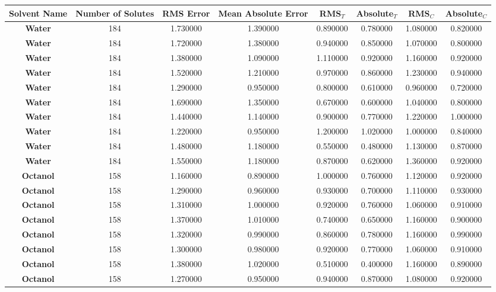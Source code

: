 \documentclass{amsart}
\begin{document}
 
\begin{center}
\begin{tabular}{c|c|c|c|c|c|c|c} 
\textbf{Solvent Name}&\textbf{Number of Solutes}&\textbf{RMS Error}&\textbf{Mean Absolute Error}&\textbf{RMS$_{T}$}&\textbf{Absolute$_{T}$}&\textbf{RMS$_{C}$}&\textbf{Absolute$_{C}$} \\ \hline
\hline 
\textbf{Water}&184&1.730000&1.390000&0.890000&0.780000&1.080000&0.820000 \\ \hline 
\textbf{Water}&184&1.720000&1.380000&0.940000&0.850000&1.070000&0.800000 \\ \hline 
\textbf{Water}&184&1.380000&1.090000&1.110000&0.920000&1.160000&0.920000 \\ \hline 
\textbf{Water}&184&1.520000&1.210000&0.970000&0.860000&1.230000&0.940000 \\ \hline 
\textbf{Water}&184&1.290000&0.950000&0.800000&0.610000&0.960000&0.720000 \\ \hline 
\textbf{Water}&184&1.690000&1.350000&0.670000&0.600000&1.040000&0.800000 \\ \hline 
\textbf{Water}&184&1.440000&1.140000&0.900000&0.770000&1.220000&1.000000 \\ \hline 
\textbf{Water}&184&1.220000&0.950000&1.200000&1.020000&1.000000&0.840000 \\ \hline 
\textbf{Water}&184&1.480000&1.180000&0.550000&0.480000&1.130000&0.870000 \\ \hline 
\textbf{Water}&184&1.550000&1.180000&0.870000&0.620000&1.360000&0.920000 \\ \hline 
\textbf{Octanol}&158&1.160000&0.890000&1.000000&0.760000&1.120000&0.920000 \\ \hline 
\textbf{Octanol}&158&1.290000&0.960000&0.930000&0.700000&1.110000&0.930000 \\ \hline 
\textbf{Octanol}&158&1.310000&1.000000&0.920000&0.760000&1.060000&0.910000 \\ \hline 
\textbf{Octanol}&158&1.370000&1.010000&0.740000&0.650000&1.160000&0.900000 \\ \hline 
\textbf{Octanol}&158&1.320000&0.990000&0.860000&0.780000&1.160000&0.990000 \\ \hline 
\textbf{Octanol}&158&1.300000&0.980000&0.920000&0.770000&1.060000&0.910000 \\ \hline 
\textbf{Octanol}&158&1.380000&1.020000&0.510000&0.400000&1.160000&0.890000 \\ \hline 
\textbf{Octanol}&158&1.270000&0.950000&0.940000&0.870000&1.080000&0.920000 \\ \hline 

\end{tabular}
\end{center}
\end{document}
